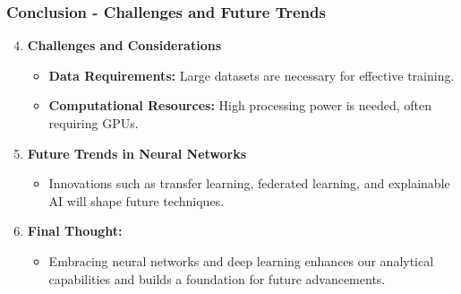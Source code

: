 \documentclass[aspectratio=169]{beamer}
\begin{document}
\begin{frame}[fragile]
    \frametitle{Conclusion - Challenges and Future Trends}
    \begin{enumerate}
        \setcounter{enumi}{3} %
        \item \textbf{Challenges and Considerations}
            \begin{itemize}
                \item \textbf{Data Requirements:} Large datasets are necessary for effective training.
                \item \textbf{Computational Resources:} High processing power is needed, often requiring GPUs.
            \end{itemize}

        \item \textbf{Future Trends in Neural Networks}
            \begin{itemize}
                \item Innovations such as transfer learning, federated learning, and explainable AI will shape future techniques.
            \end{itemize}

        \item \textbf{Final Thought:}
            \begin{itemize}
                \item Embracing neural networks and deep learning enhances our analytical capabilities and builds a foundation for future advancements.
            \end{itemize}
    \end{enumerate}
\end{frame}
\end{document}
